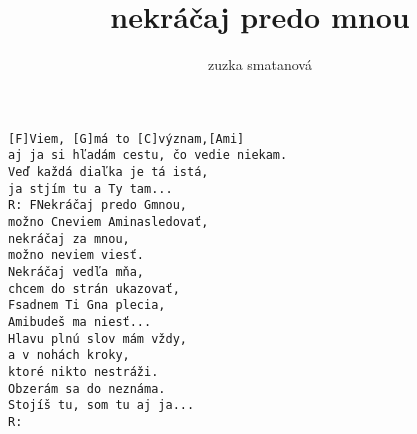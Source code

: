 \author{zuzka smatanová}
\title{nekráčaj predo mnou}
\maketitle
\begin{verbatim}
[F]Viem, [G]má to [C]význam,[Ami]
aj ja si hľadám cestu, čo vedie niekam.
Veď každá diaľka je tá istá,
ja stjím tu a Ty tam...
R: FNekráčaj predo Gmnou,
možno Cneviem Aminasledovať,
nekráčaj za mnou,
možno neviem viesť.
Nekráčaj vedľa mňa,
chcem do strán ukazovať,
Fsadnem Ti Gna plecia,
Amibudeš ma niesť...
Hlavu plnú slov mám vždy,
a v nohách kroky,
ktoré nikto nestráži.
Obzerám sa do neznáma.
Stojíš tu, som tu aj ja...
R:
\end{verbatim}